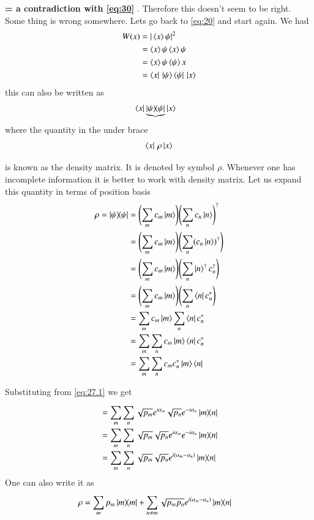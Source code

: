 \textbf{= a contradiction with \eqref{eq:30} }.
Therefore this doesn't seem to be right. Some thing is wrong somewhere.
Lets go back to \eqref{eq:20} and start again.
We had 
\begin{align}\label{eq:33}
W(x) &= \vert\braket{x}{\psi}\vert^{2}\notag\\
&=\braket{x}{\psi} \braket{x}{\psi}\notag\\
&=\braket{x}{\psi} \braket{\psi}{x}\notag\\
&=\bra{x}\thinspace\ket{\psi}\bra{\psi}\thinspace\ket{x}
\end{align}
this can also be written as 
\begin{align}\label{aft33:1}
&\bra{x}\underbrace{\dyad{{\psi}}}\ket{x}
\end{align}
where the quantity in the under brace
\begin{align}\label{aft33:2}
\bra{x} \thinspace {\rho} \ket{x}
\end{align}

is known as the density matrix. It is denoted by symbol $\rho$. Whenever one has incomplete information it is better to work with density matrix.
Let us expand this quantity in terms of position basis
\begin{align}\label{aft33:3}
\rho= \dyad{\psi}&=\Biggl(\sum_{m} {c}_{m}\ket{m}  \Biggr)\Biggl(\sum_{n} {c}_{n}\ket{n} \Biggr)^{\dagger}\notag\\
&=\Biggl(\sum_{m} {c}_{m}\ket{m}  \Biggr)\Biggl(\sum_{n} ({c}_{n}\ket{n})^{\dagger} \Biggr)\notag\\
&=\Biggl(\sum_{m} {c}_{m}\ket{m}  \Biggr)\Biggl(\sum_{n} \ket{n}^{\dagger}{c}_{n}^{\dagger} \Biggr)\notag\\
&=\Biggl(\sum_{m} {c}_{m}\ket{m}  \Biggr)\Biggl(\sum_{n} \bra{n}{c}_{n}^{*} \Biggr)\notag\\
&=\sum_{m}{c}_{m}\ket{m}\sum_{n}\bra{n}{c}_{n}^{*}\notag\\
&=\sum_{m}\sum_{n}{c}_{m}\ket{m}\bra{n}{c}_{n}^{*}\\
&=\sum_{m}\sum_{n}{c}_{m}{c}_{n}^{*}\ket{m}\bra{n}%
\end{align}

Substituting from \eqref{eq:27.1}  we get %

\begin{align}\label{aft33:4}
&=\sum_{m}\sum_{n}\sqrt{{p}_{m}} e^{i{\alpha}_{m}} \sqrt{{p}_{n}} e^{-i{\alpha}_{n}}\dyad{m}{n}\notag\\
&=\sum_{m}\sum_{n}\sqrt{{p}_{m}}  \sqrt{{p}_{n}} e^{i{\alpha}_{m}} e^{-i{\alpha}_{n}}\dyad{m}{n}\notag\\
&=\sum_{m}\sum_{n}\sqrt{{p}_{m}}\sqrt{{p}_{n}} e^{i(\alpha_{m}-\alpha_{n})} \dyad{m}{n}
\end{align}
One can also write it as
\begin{align}\label{aft33:5}
\rho &=\sum_{m}{p}_{m}\dyad{m}{m}+\sum _{ n\neq m }^{  }\sqrt { { p }_{ m }{ p }_{ n } }  { e }^{ i({ \alpha  }_{ m }-{ \alpha  }_{ n }) }\dyad{m}{n}
\end{align}

